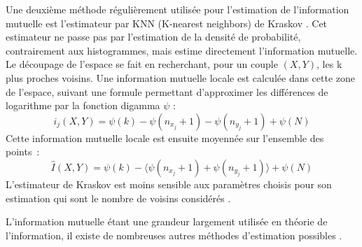 \documentclass[../main]{subfiles}
\begin{document}
Une deuxième méthode régulièrement utilisée pour l'estimation de l'information mutuelle est l'estimateur par KNN (K-nearest neighbors) de Kraskov \cite{2004kraskov}.
Cet estimateur ne passe pas par l'estimation de la densité de probabilité, contrairement aux histogrammes, mais estime directement l'information mutuelle.
Le découpage de l'espace se fait en recherchant, pour un couple $(X,Y)$, les k plus proches voisins. Une information mutuelle locale est calculée dans cette zone de l'espace, suivant une formule permettant d'approximer les différences de logarithme par la fonction digamma $\psi$ : 
$$i_j(X,Y) = \psi(k) - \psi(n_{x_j} + 1) - \psi(n_{y_j} +1) + \psi(N)$$
Cette information mutuelle locale est ensuite moyennée sur l'ensemble des points~: 
$$\hat{I}(X,Y) = \psi(k) - \langle\psi(n_{x_j} + 1) + \psi(n_{y_j} +1)\rangle + \psi(N)$$
L'estimateur de Kraskov est moins sensible aux paramètres choisis pour son estimation qui sont le nombre de voisins considérés \cite{ross_mutual_2014}.

L'information mutuelle étant une grandeur largement utilisée en théorie de l'information, il existe de nombreuses autres méthodes d'estimation possibles \cite{Doquire2012ACO}.
\end{document}
